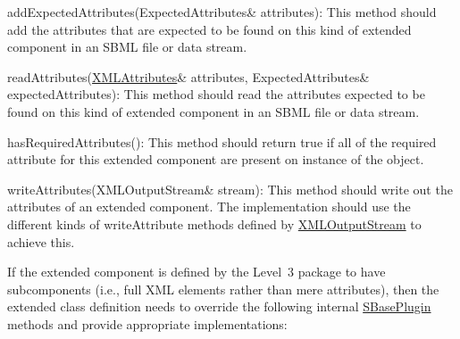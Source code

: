 \begin{DoxyItemize}
\item {\ttfamily add\+Expected\+Attributes(\+Expected\+Attributes\& attributes)}\+: This method should add the attributes that are expected to be found on this kind of extended component in an S\+B\+ML file or data stream.\end{DoxyItemize}
\begin{DoxyItemize}
\item {\ttfamily read\+Attributes(\hyperlink{class_x_m_l_attributes}{X\+M\+L\+Attributes}\& attributes, Expected\+Attributes\& expected\+Attributes)}\+: This method should read the attributes expected to be found on this kind of extended component in an S\+B\+ML file or data stream.\end{DoxyItemize}
\begin{DoxyItemize}
\item {\ttfamily has\+Required\+Attributes()}\+: This method should return {\ttfamily true} if all of the required attribute for this extended component are present on instance of the object.\end{DoxyItemize}
\begin{DoxyItemize}
\item {\ttfamily write\+Attributes(\+X\+M\+L\+Output\+Stream\& stream)}\+: This method should write out the attributes of an extended component. The implementation should use the different kinds of {\ttfamily write\+Attribute} methods defined by \hyperlink{class_x_m_l_output_stream}{X\+M\+L\+Output\+Stream} to achieve this.\end{DoxyItemize}


If the extended component is defined by the Level~3 package to have subcomponents (i.\+e., full X\+ML elements rather than mere attributes), then the extended class definition needs to override the following internal \hyperlink{class_s_base_plugin}{S\+Base\+Plugin} methods and provide appropriate implementations\+:

